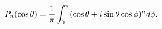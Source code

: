 \[\mathop{P_{n}\/}\nolimits\!\left(\mathop{\cos\/}\nolimits\theta\right)=\frac{1%
}{\pi}\int_{0}^{\pi}(\mathop{\cos\/}\nolimits\theta+i\mathop{\sin\/}\nolimits%
\theta\mathop{\cos\/}\nolimits\phi)^{n}d\phi.\]